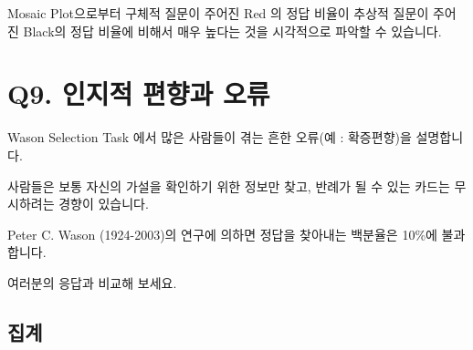 \documentclass[
]{book}
\begin{document}
Mosaic Plot으로부터 구체적 질문이 주어진 Red 의 정답 비율이 추상적 질문이 주어진 Black의 정답 비율에 비해서 매우 높다는 것을 시각적으로 파악할 수 있습니다.

\section{Q9. 인지적 편향과 오류}\label{q9.-uxc778uxc9c0uxc801-uxd3b8uxd5a5uxacfc-uxc624uxb958}

Wason Selection Task 에서 많은 사람들이 겪는 흔한 오류(예 : 확증편향)을 설명합니다.

사람들은 보통 자신의 가설을 확인하기 위한 정보만 찾고, 반례가 될 수 있는 카드는 무시하려는 경향이 있습니다.

Peter C. Wason (1924-2003)의 연구에 의하면 정답을 찾아내는 백분율은 10\%에 불과합니다.

여러분의 응답과 비교해 보세요.

\subsection{집계}\label{uxc9d1uxacc4-15}
\end{document}
